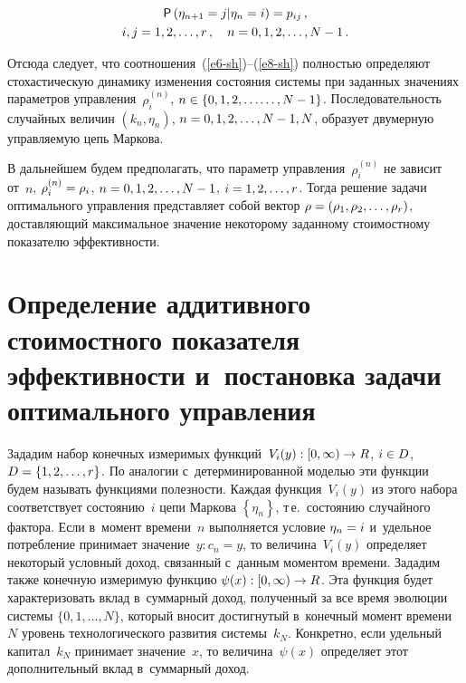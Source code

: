 \begin{multicols}{2}
\vspace*{-6pt}

\noindent
     \begin{multline}
     {\sf P}\left( \eta_{n+1}=j\vert \eta_n=i\right) =p_{ij}\,,\\
      i,j=1,2,\ldots , r\,,\quad
     n=0,1,2,\ldots , N-1\,.
     \label{e8-sh}
     \end{multline}
     
     \vspace*{-2pt}
     
     
   \noindent
     Отсюда следует, что соотношения~(\ref{e6-sh})--(\ref{e8-sh}) пол\-ностью 
определяют стохастическую динамику \mbox{изменения} со\-сто\-яния сис\-те\-мы при 
заданных значениях па\-ра\-мет\-ров управ\-ле\-ния~$\rho_i^{(n)}$, $n\hm\in \{0,1,2,\ldots$\linebreak $\ldots , 
N\hm-1\}$. По\-сле\-до\-ва\-тель\-ность случайных величин $(k_n,\eta_n)$, $n\hm= 
0,1,2,\ldots , N\hm-1, N$, образует двумерную управ\-ля\-емую цепь Маркова.
     
     В дальнейшем будем предполагать, что параметр управления~$\rho_i^{(n)}$ 
не зависит от~$n$, $\rho_i^{(n)}\hm=\rho_i$, $n\hm=0,1,2,\ldots , N\hm-1$, $i\hm=1,2,\ldots , r$. Тогда 
решение задачи оптимального управления представляет собой вектор $\rho\hm= 
(\rho_1, \rho_2, \ldots , \rho_r)$, доставляющий максимальное значение некоторому 
заданному стоимостному показателю эффективности.

\section{Определение аддитивного стоимостного показателя 
эффективности и~постановка задачи оптимального управления}

     Зададим набор конечных измеримых функций~$V_i(y): [0,\infty)\hm\to R$, 
$i\hm\in D$, $D\hm= \{1,2,\ldots , r\}$. По аналогии с~детерминированной моделью 
эти функции будем называть функциями по\-лез\-ности. Каждая функция~$V_i(y)$  
из этого набора соответствует состоянию~$i$ цепи Маркова $\left\{ \eta_n\right\}$, 
т\,е.\ со\-сто\-янию случайного фактора. Если в~момент времени~$n$ выполняется 
условие $\eta_n\hm=i$ и~удельное по\-треб\-ле\-ние принимает значение~$y: c_n=y$, то 
величина~$V_i(y)$ определяет некоторый услов\-ный доход, связанный с~данным моментом времени. 
Зададим также конечную измеримую функцию $\psi(x): [0,\infty)\hm\to R$. Эта 
функция будет характеризовать вклад в~суммарный доход, полученный за все 
время эволюции сис\-те\-мы $\{0,1,\ldots , N\}$, который вносит достигнутый 
в~конечный момент времени $N$ уровень технологического развития 
сис\-те\-мы~$k_N$. Конкретно, если удельный капитал~$k_N$ принимает 
значение~$x$, то величина~$\psi(x)$ определяет этот дополнительный вклад 
в~суммарный доход.
     

\end{multicols}
